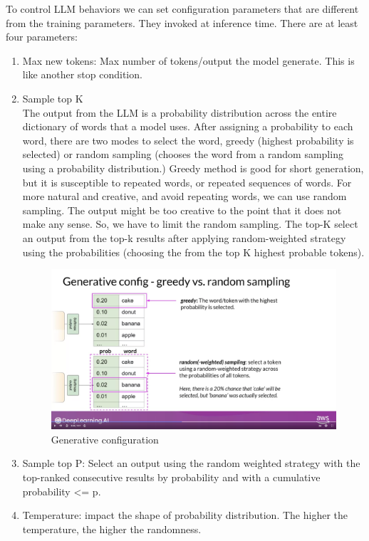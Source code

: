 \documentclass[12pt]{report}
\begin{document}
To control LLM behaviors we can set configuration parameters that are different from the training parameters. They invoked at inference time. There are at least four parameters:
\begin{enumerate}
  \item Max new tokens: Max number of tokens/output the model generate. This is like another stop condition.
  \item Sample top K\\
  The output from the LLM is a probability distribution across the entire dictionary of words that a model uses. After assigning a probability to each word, there are two modes to select the word, greedy (highest probability is selected) or random sampling (chooses the word from a random sampling using a probability distribution.)
  Greedy method is good for short generation, but it is susceptible to repeated words, or repeated sequences of words. For more natural and creative, and avoid repeating words, we can use random sampling. The output might be too creative to the point that it does not make any sense. So, we have to limit the random sampling.
  The top-K select an output from the top-k results after applying random-weighted strategy using the probabilities (choosing the from the top K highest probable tokens).

\begin{figure}[H]
  \centering
  \caption{Generative configuration}
  \includegraphics[trim=3cm 6cm 5cm 0cm,clip,scale=0.15]{pics/config.png}
\end{figure}


  \item Sample top P: Select an output using the random weighted strategy with the top-ranked consecutive results by probability  and with a cumulative probability <= p.
  \item Temperature: impact the shape of probability distribution.  The higher the temperature, the higher the randomness.


\end{enumerate}
\end{document}
